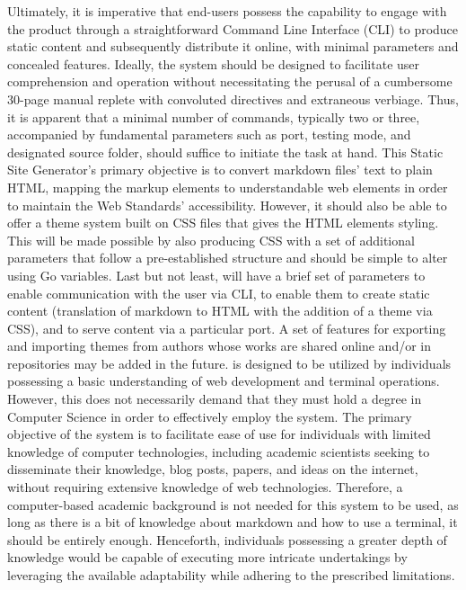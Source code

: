 {}Ultimately, it is imperative that end-users possess the capability to engage with the product through a straightforward Command Line Interface (CLI) to produce static content and subsequently distribute it online, with minimal parameters and concealed features. Ideally, the system should be designed to facilitate user comprehension and operation without necessitating the perusal of a cumbersome 30-page manual replete with convoluted directives and extraneous verbiage. Thus, it is apparent that a minimal number of commands, typically two or three, accompanied by fundamental parameters such as port, testing mode, and designated source folder, should suffice to initiate the task at hand.\markdownRendererInterblockSeparator
{}\markdownRendererInterblockSeparator
{}This Static Site Generator's primary objective is to convert markdown files' text to plain HTML, mapping the markup elements to understandable web elements in order to maintain the Web Standards' accessibility.\markdownRendererInterblockSeparator
{}However, it should also be able to offer a theme system built on CSS files that gives the HTML elements styling. This will be made possible by also producing CSS with a set of additional parameters that follow a pre-established structure and should be simple to alter using Go variables.\markdownRendererInterblockSeparator
{}Last but not least,  will have a brief set of parameters to enable communication with the user via CLI, to enable them to create static content (translation of markdown to HTML with the addition of a theme via CSS), and to serve content via a particular port. A set of features for exporting and importing themes from authors whose works are shared online and/or in repositories may be added in the future.\markdownRendererInterblockSeparator
{}\markdownRendererInterblockSeparator
{} is designed to be utilized by individuals possessing a basic understanding of web development and terminal operations. However, this does not necessarily demand that they must hold a degree in Computer Science in order to effectively employ the system. The primary objective of the system is to facilitate ease of use for individuals with limited knowledge of computer technologies, including academic scientists seeking to disseminate their knowledge, blog posts, papers, and ideas on the internet, without requiring extensive knowledge of web technologies.\markdownRendererInterblockSeparator
{}Therefore, a computer-based academic background is not needed for this system to be used, as long as there is a bit of knowledge about markdown and how to use a terminal, it should be entirely enough. Henceforth, individuals possessing a greater depth of knowledge would be capable of executing more intricate undertakings by leveraging the available adaptability while adhering to the prescribed limitations.\markdownRendererInterblockSeparator
